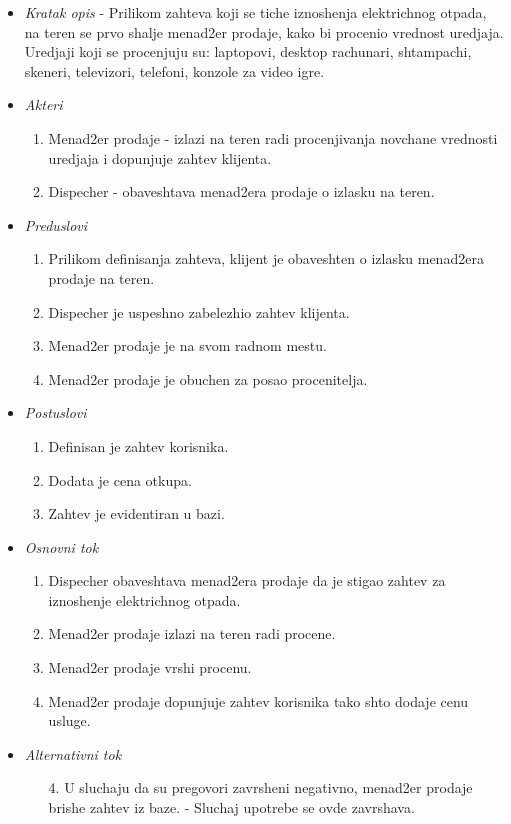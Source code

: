 \documentclass[10 pt]{article}
\begin{document}
		\begin{itemize}

			\item\textit{Kratak opis} - Prilikom zahteva koji se tiche iznoshenja elektrichnog otpada, na teren se prvo shalje menad2er prodaje,
			kako bi procenio vrednost uredjaja. Uredjaji koji se procenjuju su:
			laptopovi, desktop rachunari, shtampachi, skeneri, televizori, telefoni, konzole za video igre.
			
			\item\textit{Akteri}
				\begin{enumerate}
					\item Menad2er prodaje - izlazi na teren radi procenjivanja novchane vrednosti uredjaja i dopunjuje zahtev klijenta.
					\item Dispecher - obaveshtava menad2era prodaje o izlasku na teren.
				\end{enumerate}
			
			\item\textit{Preduslovi} 
				\begin{enumerate} 
					\item Prilikom definisanja zahteva, klijent je obaveshten o izlasku menad2era prodaje na teren.
					\item Dispecher je uspeshno zabelezhio zahtev klijenta.
					\item Menad2er prodaje je na svom radnom mestu.
					\item Menad2er prodaje je obuchen za posao procenitelja.
				\end{enumerate}			
			
			\item\textit{Postuslovi}
				\begin{enumerate}
					\item Definisan je zahtev korisnika. 
					\item Dodata je cena otkupa.
					\item Zahtev je evidentiran u bazi.
				\end{enumerate}
			
			\item\textit{Osnovni tok}
				\begin{enumerate} 
					\item Dispecher obaveshtava menad2era prodaje da je stigao zahtev za iznoshenje elektrichnog otpada.
					\item Menad2er prodaje izlazi na teren radi procene.
					\item Menad2er prodaje vrshi procenu.
					\item Menad2er prodaje dopunjuje zahtev korisnika tako shto dodaje cenu usluge.
				\end{enumerate}
			
			\item\textit{Alternativni tok}
				\begin{enumerate}
					\item [4.] U sluchaju da su pregovori zavrsheni negativno, menad2er prodaje brishe zahtev iz baze. - Sluchaj upotrebe se ovde zavrshava.
				\end{enumerate}
			
		\end{itemize}
	
\end{document}
